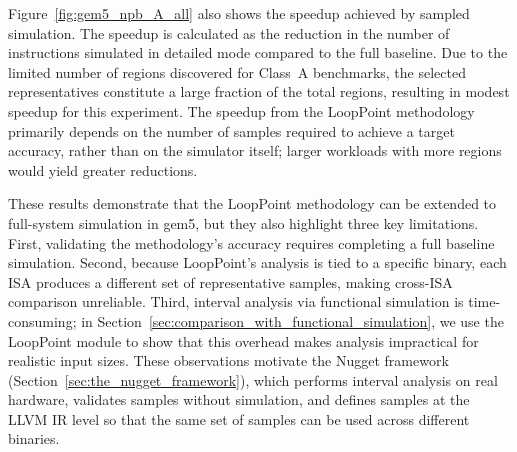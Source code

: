 Figure~\ref{fig:gem5_npb_A_all} also shows the speedup achieved by sampled simulation.
The speedup is calculated as the reduction in the number of instructions simulated in detailed mode compared to the full baseline.
Due to the limited number of regions discovered for Class~A benchmarks, the selected representatives constitute a large fraction of the total regions, resulting in modest speedup for this experiment.
The speedup from the LoopPoint methodology primarily depends on the number of samples required to achieve a target accuracy, rather than on the simulator itself; larger workloads with more regions would yield greater reductions.

These results demonstrate that the LoopPoint methodology can be extended to full-system simulation in gem5, but they also highlight three key limitations.
First, validating the methodology's accuracy requires completing a full baseline simulation.
Second, because LoopPoint's analysis is tied to a specific binary, each ISA produces a different set of representative samples, making cross-ISA comparison unreliable.
Third, interval analysis via functional simulation is time-consuming; in Section~\ref{sec:comparison_with_functional_simulation}, we use the LoopPoint module to show that this overhead makes analysis impractical for realistic input sizes.
These observations motivate the Nugget framework (Section~\ref{sec:the_nugget_framework}), which performs interval analysis on real hardware, validates samples without simulation, and defines samples at the LLVM IR level so that the same set of samples can be used across different binaries.
